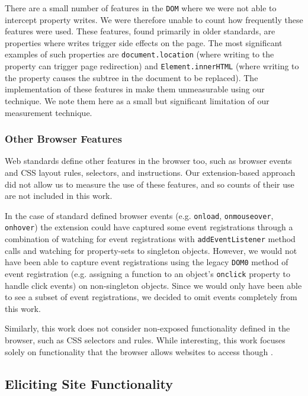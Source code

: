 There are a small number of features in the \texttt{DOM} where we were not
able to intercept property writes.  We were therefore unable to count how frequently
these features were used.  These features, found primarily in older standards,
are properties where writes trigger side effects on the page.  The most significant
examples of such properties are \texttt{document.location} (where writing to
the property can trigger page redirection) and \texttt{Element.innerHTML}
(where writing to the property causes the subtree in the document to be replaced).
The implementation of these features in \FF make them unmeasurable using
our technique.  We note them here as a small but significant limitation of our
measurement technique.


\subsubsection{Other Browser Features}
Web standards define other features in the browser too, such as browser events
and CSS layout rules, selectors, and instructions.  Our extension-based
approach did not allow us to measure the use of these features, and so counts
of their use are not included in this work.

In the case of standard defined browser events (e.g. \texttt{onload},
\texttt{onmouseover}, \texttt{onhover}) the extension could have
captured some event registrations through a combination of watching for
event registrations with \texttt{addEventListener} method calls
and watching for property-sets to singleton objects.  However, we would not
have been able to capture event registrations using the legacy \texttt{DOM0}
method of event registration (e.g. assigning a function to an object's
\texttt{onclick} property to handle click events) on non-singleton objects.
Since we would only have been able to see a subset of event registrations,
we decided to omit events completely from this work.

Similarly, this work does not consider non-\JS exposed functionality
defined in the browser, such as CSS selectors and rules.  While interesting,
this work focuses solely on functionality that the browser allows websites to
access though \JS.


\subsection{Eliciting Site Functionality}
\label{measurement:methodology:eliciting-site-functionality}

